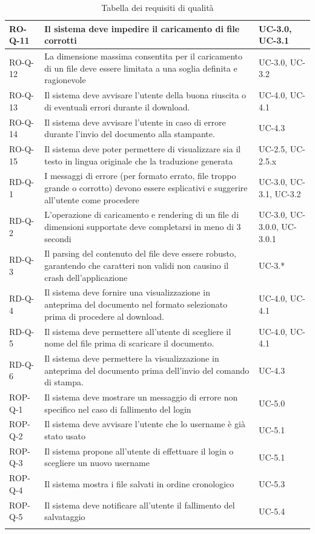 \documentclass[11pt,a4paper]{article}
\begin{document}
\begin{longtable}{|p{}|>{\raggedright\arraybackslash}p{}|p{}|}
\hline
RO-Q-11 & Il sistema deve impedire il caricamento di file corrotti & UC-3.0, UC-3.1\\
\hline
RO-Q-12 & La dimensione massima consentita per il caricamento di un file deve essere limitata a una soglia definita e ragionevole & UC-3.0, UC-3.2 \\
\hline
RO-Q-13 & Il sistema deve avvisare l'utente della buona riuscita o di eventuali errori durante il download. & UC-4.0, UC-4.1 \\
\hline
RO-Q-14 & Il sistema deve avvisare l’utente in caso di errore durante l’invio del documento alla stampante. & UC-4.3 \\
\hline
RO-Q-15 & Il sistema deve poter permettere di visualizzare sia il testo in lingua originale che la traduzione generata & UC-2.5, UC-2.5.x \\
\hline
RD-Q-1 & I messaggi di errore (per formato errato, file troppo grande o corrotto) devono essere esplicativi e suggerire all'utente come procedere & UC-3.0, UC-3.1, UC-3.2 \\
\hline
RD-Q-2 & L'operazione di caricamento e rendering di un file di dimensioni supportate deve completarsi in meno di 3 secondi & UC-3.0, UC-3.0.0, UC-3.0.1 \\
\hline
RD-Q-3 & Il parsing del contenuto del file deve essere robusto, garantendo che caratteri non validi non causino il crash dell'applicazione & UC-3.* \\
\hline
RD-Q-4 & Il sistema deve fornire una visualizzazione in anteprima del documento nel formato selezionato prima di procedere al download. & UC-4.0, UC-4.1 \\
\hline
RD-Q-5 & Il sistema deve permettere all'utente di scegliere il nome del file prima di scaricare il documento. & UC-4.0, UC-4.1 \\
\hline
RD-Q-6 & Il sistema deve permettere la visualizzazione in anteprima del documento prima dell'invio del comando di stampa. & UC-4.3 \\
\hline
ROP-Q-1 & Il sistema deve mostrare un messaggio di errore non specifico nel caso di fallimento del login & UC-5.0 \\
\hline
ROP-Q-2 & Il sistema deve avvisare l'utente che lo username è già stato usato & UC-5.1 \\
\hline
ROP-Q-3 & Il sistema propone all'utente di effettuare il login o scegliere un nuovo username & UC-5.1 \\
\hline
ROP-Q-4 & Il sistema mostra i file salvati in ordine cronologico & UC-5.3 \\
\hline
ROP-Q-5 & Il sistema deve notificare all'utente il fallimento del salvataggio & UC-5.4 \\
\hline
\addlinespace[1em]
\caption{Tabella dei requisiti di qualità}
\end{longtable}
\end{document}
